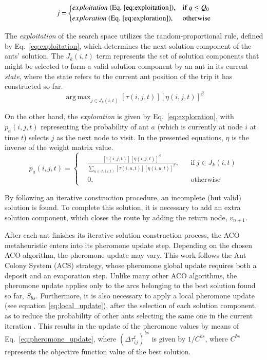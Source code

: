 \documentclass[onecolumn]{elsarticle}
\DeclareMathOperator*{\argmax}{arg\,max}
\begin{document}
\begin{equation}
  \label{eq:selection_rule}
  j =  \left \{
    \begin{aligned}
      & exploitation \ (\text{Eq.} \ \ref{eq:exploitation}) , && \text{if}\ q \leq Q_0 \\
      & exploration \ (\text{Eq.} \ \ref{eq:exploration}), && \text{otherwise}
    \end{aligned} \right. 
\end{equation}

The \textit{exploitation} of the search space utilizes the random-proportional rule, defined by Eq.~\ref{eq:exploitation}, which determines the next solution component of the ants' solution. The $J_k(i,t)$ term represents the set of solution components that might be selected to form a valid solution component by an ant in its current \textit{state}, where the state refers to the current ant position of the trip it has constructed so far.
\begin{equation}
  \label{eq:exploitation}
    \argmax_{j \in J_k(i,t)} {[\tau(i,j,t)][\eta(i,j,t)]^\beta}
\end{equation}

On the other hand, the \textit{exploration} is given by Eq.~\ref{eq:exploration}, with $p_a(i,j,t)$ representing the probability of ant $a$ (which is currently at node $i$ at time $t$) selects $j$ as the next node to visit. In the presented equations, $\eta$ is the inverse of the weight matrix value.
\begin{equation}
\label{eq:exploration}
  p_a(i,j,t) =  \left \{
    \begin{aligned}
      & \frac{[\tau(i,j,t)][\eta(i,j,t)]^\beta}{\sum_{u \in J_k(i,t)}[\tau(i,u,t)][\eta(i,u,t)]^\beta}, && \text{if}\ j \in J_k(i,t) \\
      &0, && \text{otherwise}
    \end{aligned} \right. 
\end{equation}

By following an iterative construction procedure, an incomplete (but valid) solution is found. To complete this solution, it is necessary to add an extra solution component, which closes the route by adding the return node, $v_{n+1}$.

After each ant finishes its iterative solution construction process, the ACO metaheuristic enters into its pheromone update step. Depending on the chosen ACO algorithm, the pheromone update may vary. This work follows the Ant Colony System (ACS) strategy, whose pheromone global update requires both a deposit and an evaporation step. Unlike many other ACO algorithms, the pheromone update applies only to the arcs belonging to the best solution found so far, $S_{bs}$. Furthermore, it is also necessary to apply a local pheromone update (see equation \ref{eq:local_update}), after the selection of each solution component, as to reduce the probability of other ants selecting the same one in the current iteration \cite{aco_tsp}. This results in the update of the pheromone values by means of Eq.~\ref{eq:pheromone_update}, where $(\Delta\tau_{ij}^{t})^{bs}$ is given by $1/C^{bs}$, where $C^{bs}$ represents the objective function value of the best solution.
\end{document}
